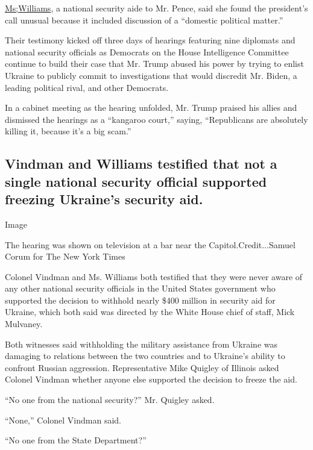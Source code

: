 \href{https://www.nytimes.com/2019/11/19/us/politics/jennifer-williams.html}{Ms;Williams},
a national security aide to Mr. Pence, said she found the president's
call unusual because it included discussion of a ``domestic political
matter.''

Their testimony kicked off three days of hearings featuring nine
diplomats and national security officials as Democrats on the House
Intelligence Committee continue to build their case that Mr. Trump
abused his power by trying to enlist Ukraine to publicly commit to
investigations that would discredit Mr. Biden, a leading political
rival, and other Democrats.

In a cabinet meeting as the hearing unfolded, Mr. Trump praised his
allies and dismissed the hearings as a ``kangaroo court,'' saying,
``Republicans are absolutely killing it, because it's a big scam.''

\hypertarget{vindman-and-williams-testified-that-not-a-single-national-security-official-supported-freezing-ukraines-security-aid}{%
\subsection{Vindman and Williams testified that not a single national
security official supported freezing Ukraine's security
aid.}\label{vindman-and-williams-testified-that-not-a-single-national-security-official-supported-freezing-ukraines-security-aid}}

Image

The hearing was shown on television at a bar near the
Capitol.Credit...Samuel Corum for The New York Times

Colonel Vindman and Ms. Williams both testified that they were never
aware of any other national security officials in the United States
government who supported the decision to withhold nearly \$400 million
in security aid for Ukraine, which both said was directed by the White
House chief of staff, Mick Mulvaney.

Both witnesses said withholding the military assistance from Ukraine was
damaging to relations between the two countries and to Ukraine's ability
to confront Russian aggression. Representative Mike Quigley of Illinois
asked Colonel Vindman whether anyone else supported the decision to
freeze the aid.

``No one from the national security?'' Mr. Quigley asked.

``None,'' Colonel Vindman said.

``No one from the State Department?''

